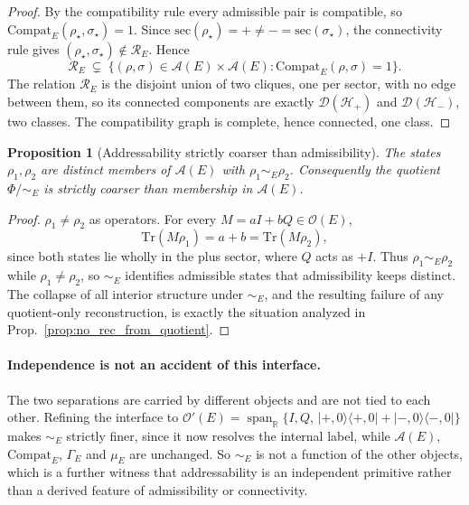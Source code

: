 \documentclass[aps,prx,onecolumn,11pt]{revtex4-2}
\theoremstyle{plain}
\newtheorem{proposition}{Proposition}
\theoremstyle{definition}
\theoremstyle{remark}
\begin{document}
\begin{proof}
By the compatibility rule every admissible pair is compatible, so
\(\mathrm{Compat}_E(\rho_\star,\sigma_\star)=1\). Since
\(\mathrm{sec}(\rho_\star)=+\neq-=\mathrm{sec}(\sigma_\star)\), the
connectivity rule gives
\((\rho_\star,\sigma_\star)\notin\mathcal R_E\). Hence
\[
\mathcal R_E\ \subsetneq\
\{(\rho,\sigma)\in\mathcal A(E)\times\mathcal A(E):
\mathrm{Compat}_E(\rho,\sigma)=1\}.
\]
The relation \(\mathcal R_E\) is the disjoint union of two cliques, one
per sector, with no edge between them, so its connected components are
exactly \(\mathcal D(\mathcal H_+)\) and \(\mathcal D(\mathcal H_-)\),
two classes. The compatibility graph is complete, hence connected, one
class.
\end{proof}

\begin{proposition}[Addressability strictly coarser than admissibility]
\label{prop:addressability_strict}
The states \(\rho_1,\rho_2\) are distinct members of \(\mathcal A(E)\)
with \(\rho_1\sim_E\rho_2\). Consequently the quotient
\(\Phi/{\sim_E}\) is strictly coarser than membership in
\(\mathcal A(E)\).
\end{proposition}

\begin{proof}
\(\rho_1\neq\rho_2\) as operators. For every
\(M=aI+bQ\in\mathcal O(E)\),
\[
\mathrm{Tr}(M\rho_1)=a+b=\mathrm{Tr}(M\rho_2),
\]
since both states lie wholly in the plus sector, where \(Q\) acts as
\(+I\). Thus \(\rho_1\sim_E\rho_2\) while
\(\rho_1\neq\rho_2\), so \(\sim_E\) identifies admissible states that
admissibility keeps distinct. The collapse of all interior structure
under \(\sim_E\), and the resulting failure of any quotient-only
reconstruction, is exactly the situation analyzed in
Prop.~\ref{prop:no_rec_from_quotient}.
\end{proof}

\paragraph{Independence is not an accident of this interface.}

The two separations are carried by different objects and are not tied to
each other. Refining the interface to
\(\mathcal O'(E)=\operatorname{span}_{\mathbb R}\{I,Q,\,
\lvert +,0\rangle\langle +,0\rvert+\lvert -,0\rangle\langle -,0\rvert\}\)
makes \(\sim_E\) strictly finer, since it now resolves the internal
label, while \(\mathcal A(E)\), \(\mathrm{Compat}_E\), \(\Gamma_E\) and
\(\mu_E\) are unchanged. So \(\sim_E\) is not a function of the other
objects, which is a further witness that addressability is an
independent primitive rather than a derived feature of admissibility or
connectivity.
\end{document}
